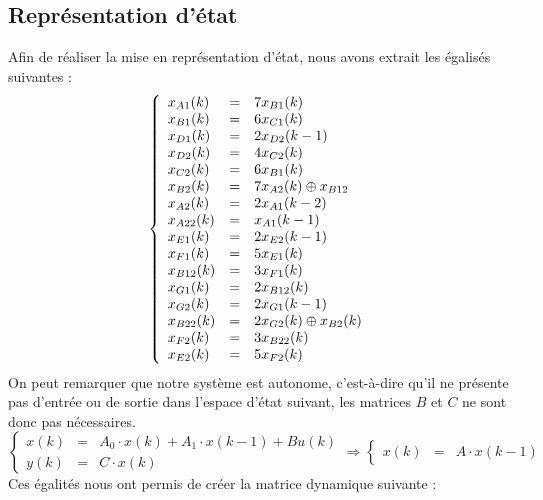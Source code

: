 \subsection{Représentation d'état}
Afin de réaliser la mise en représentation d'état, nous avons extrait les égalisés suivantes :
\begin{equation}
\label{equ:ee1}
\left\lbrace
\begin{array}{l c l}
x_{A1}(k) &=&	7x_{B1}(k)\\ 
x_{B1}(k) &=&	6x_{C1}(k)\\
x_{D1}(k) &=&	2x_{D2}(k-1)\\
x_{D2}(k) &=&	4x_{C2}(k)\\
x_{C2}(k) &=&	6x_{B1}(k)\\
x_{B2}(k) &=&	7x_{A2}(k) \oplus x_{B12}\\
x_{A2}(k) &=&	2x_{A1}(k-2)\\
x_{A22}(k) &=&	x_{A1}(k-1)\\
x_{E1}(k) &=&	2x_{E2}(k-1)\\
x_{F1}(k) &=&	5x_{E1}(k)\\
x_{B12}(k) &=&	3x_{F1}(k)\\
x_{G1}(k) &=&	2x_{B12}(k)\\
x_{G2}(k) &=&	2x_{G1}(k-1)\\
x_{B22}(k) &=&	2x_{G2}(k) \oplus x_{B2}(k)\\
x_{F2}(k) &=&	3x_{B22}(k)\\
x_{E2}(k) &=&	5x_{F2}(k)   \\  
\end{array}
\right.
\end{equation}
On peut remarquer que notre système est autonome, c'est-à-dire qu'il ne présente pas d'entrée ou de sortie 
dans l'espace d'état suivant, les matrices $B$ et $C$ ne sont donc pas nécessaires.
\begin{equation}
\left\lbrace
\begin{array}{lcl}
	x(k) &=& A_0 \cdot x(k) + A_1 \cdot x(k-1) + B u(k)\\
	y(k) &=& C \cdot x(k)
\end{array}
\right. \Rightarrow
\left\lbrace\begin{array}{lcl}
	x(k) &=& A \cdot x(k-1)
\end{array}\right.
\end{equation}
Ces égalités nous ont permis de créer la matrice dynamique suivante : 

